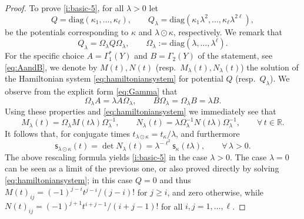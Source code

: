 \documentclass[11pt,a4paper]{article}
\theoremstyle{plain}
\theoremstyle{definition}
\theoremstyle{remark}
\numberwithin{equation}{section}
\newcommand{\R}{\mathbb{R}} %
\newcommand{\sfs}{\mathsf{s}}
\begin{document}
\begin{proof}
To prove \ref{i:basic-5}, for all $\lambda>0$ let
\begin{equation}
Q=\mathrm{diag}(\kappa_1,\dots,\kappa_\ell), \qquad Q_{\lambda} = \mathrm{diag} (\kappa_1 \lambda^2,\dots,\kappa_\ell \lambda^{2\ell}),
\end{equation}
be the potentials corresponding to $\kappa$ and $\lambda \odot \kappa$, respectively. We remark that
\begin{equation}
Q_\lambda = \Omega_\lambda Q \Omega_{\lambda}, \qquad \Omega_\lambda := \mathrm{diag}(\lambda,\dots,\lambda^\ell).
\end{equation}
For the specific choice $A=\Gamma_1^*(Y)$ and $B=\Gamma_2(Y)$ of the statement, see \eqref{eq:AandB}, we denote by $M(t),N(t)$ (resp.\ $M_{\lambda}(t),N_{\lambda}(t)$) the solution of the Hamiltonian system \eqref{eq:hamiltoniansystem} for potential $Q$ (resp.\ $Q_{\lambda}$). We observe from the explicit form \eqref{eq:Gamma} that
\begin{equation}
\Omega_{\lambda} A = \lambda A \Omega_{\lambda} ,\qquad B\Omega_{\lambda} = \Omega_{\lambda} B = \lambda B.
\end{equation}
Using these properties and \eqref{eq:hamiltoniansystem} we immediately see that
\begin{equation}
M_{\lambda}(t) = \Omega_{\lambda} M(t\lambda)\Omega_{\lambda}^{-1},\qquad N_{\lambda}(t)=\lambda \Omega_{\lambda}^{-1} N(t\lambda)\Omega_{\lambda}^{-1},\qquad \forall\, t\in \R.
\end{equation}
It follows that, for conjugate times $t_{\lambda\odot \kappa} = t_{\kappa}/\lambda$, and furthermore
\begin{equation}
\sfs_{\lambda\odot\kappa}(t) =\det N_{\lambda}(t) = \lambda^{-\ell^2} \sfs_{\kappa}(t\lambda),\qquad \forall\, \lambda>0.
\end{equation}
The above rescaling formula yields  \ref{i:basic-5} in the case $\lambda>0$. The case $\lambda=0$ can be seen as a limit of the previous one, or also proved directly by solving \eqref{eq:hamiltoniansystem}; in this case $Q=0$ and thus $M(t)_{ij} = (-1)^{j-i}t^{j-i}/(j-i)!$ for $j\geq i$, and zero otherwise, while $N(t)_{ij} = (-1)^{j+1}t^{i+j-1}/(i+j-1)!$ for all $i,j=1,\dots,\ell$.


\end{proof}
\end{document}
